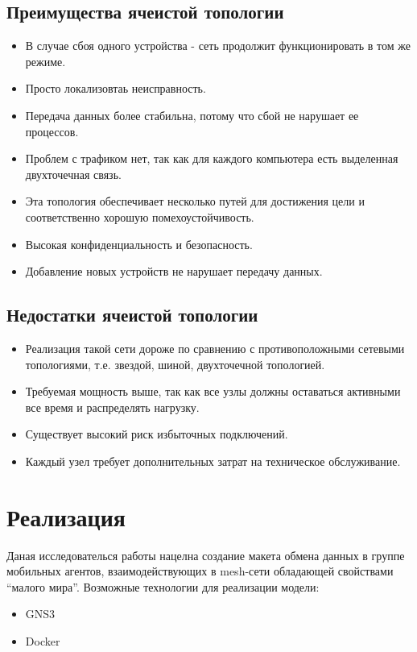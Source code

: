\documentclass[a4paper]{article}
\begin{document}
\subsection[]{Преимущества ячеистой топологии}
\begin{itemize}
    \item В случае сбоя одного устройства - сеть продолжит функционировать в том же режиме.
    \item Просто локализовтаь неисправность.
    \item Передача данных более стабильна, потому что сбой не нарушает ее процессов.
    \item Проблем с трафиком нет, так как для каждого компьютера есть выделенная двухточечная связь.
    \item Эта топология обеспечивает несколько путей для достижения цели и соответственно хорошую помехоустойчивость.
    \item Высокая конфиденциальность и безопасность.
    \item Добавление новых устройств не нарушает передачу данных.
\end{itemize}

\subsection[]{Недостатки ячеистой топологии}
\begin{itemize}
    \item Реализация такой сети дороже по сравнению с противоположными сетевыми топологиями, т.е. звездой, шиной, двухточечной топологией.
    \item Требуемая мощность выше, так как все узлы должны оставаться активными все время и распределять нагрузку.
    \item Существует высокий риск избыточных подключений.
    \item Каждый узел требует дополнительных затрат на техническое обслуживание.
\end{itemize}

\section[]{Реализация}
Даная исследователься работы нацелна создание макета обмена данных в группе мобильных агентов, взаимодействующих в mesh-сети обладающей свойствами “малого мира”.
Возможные технологии для реализации модели:
\begin{itemize}
    \item GNS3
    \item Docker
\end{itemize}
\end{document}
